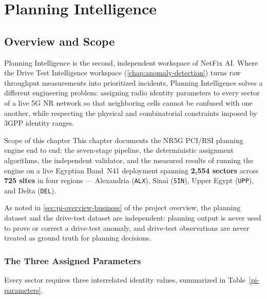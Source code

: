 \chapter{Planning Intelligence}
\label{chap:planning-intelligence}

\section{Overview and Scope}
\label{sec:pi-overview}

Planning Intelligence is the second, independent workspace of NetFix AI. Where the
Drive Test Intelligence workspace (\cref{chap:anomaly-detection}) turns raw
throughput measurements into prioritized incidents, Planning Intelligence solves a
different engineering problem: assigning radio identity parameters to every sector
of a live 5G NR network so that neighboring cells cannot be confused with one
another, while respecting the physical and combinatorial constraints imposed by
3GPP identity ranges.

\begin{infobox}{Scope of this chapter}
This chapter documents the NR5G PCI/RSI planning engine end to end: the
seven-stage pipeline, the deterministic assignment algorithms, the independent
validator, and the measured results of running the engine on a live Egyptian
Band~N41 deployment spanning \textbf{2{,}554 sectors} across \textbf{725 sites}
in four regions --- Alexandria (\texttt{ALX}), Sinai (\texttt{SIN}), Upper Egypt
(\texttt{UPP}), and Delta (\texttt{DEL}).
\end{infobox}

As noted in \cref{sec:pi-overview-business} of the project overview, the planning
dataset and the drive-test dataset are independent: planning output is never used
to prove or correct a drive-test anomaly, and drive-test observations are never
treated as ground truth for planning decisions.

\subsection{The Three Assigned Parameters}

Every sector requires three interrelated identity values, summarized in
Table~\ref{pi-parameters}.

